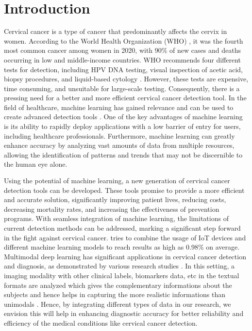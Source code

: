\documentclass[12pt]{report}
\begin{document}
\section{Introduction}
\label{sec:intro}
Cervical cancer is a type of cancer that predominantly affects the cervix in women. According to the World Health Organization (WHO) \cite{WHO}, it was the fourth most common cancer among women in 2020, with 90\% of new cases and deaths occurring in low and middle-income countries. WHO recommends four different tests for detection, including HPV DNA testing, visual inspection of acetic acid, biopsy procedures, and liquid-based cytology \cite{XGBoost}. However, these tests are expensive, time consuming, and unsuitable for large-scale testing. Consequently, there is a pressing need for a better and more efficient cervical cancer detection tool\cite{win2020computer}. In the field of healthcare, machine learning has gained relevance and can be used to create advanced detection tools \cite{HealthCareML}. One of the key advantages of machine learning is its ability to rapidly deploy applications with a low barrier of entry for users, including healthcare professionals\cite{lee2021application}. Furthermore, machine learning can greatly enhance accuracy by analyzing vast amounts of data from multiple resources\cite{gorriz2020artificial}, allowing the identification of patterns and trends that may not be discernible to the human eye alone.

Using the potential of machine learning, a new generation of cervical cancer detection tools can be developed\cite{katki2009risk}. These tools promise to provide a more efficient and accurate solution, significantly improving patient lives, reducing costs, decreasing mortality rates, and increasing the effectiveness of prevention programs. With seamless integration of machine learning, the limitations of current detection methods can be addressed, marking a significant step forward in the fight against cervical cancer.\cite{IoT} tries to combine the usage of IoT devices and different machine learning models to reach results as high as 0.98\% on average. \\
\indent Multimodal deep learning has significant applications in cervical cancer detection and diagnosis, as demonstrated by various research studies \cite{ming2022deep,xu2016multimodal}. In this setting, a imaging modality with other clinical labels, biomarkers data, etc in the textual formats are analyzed which gives the complementary informations about the subjects and hence helps in capturing the more realistic informations than unimodals \cite{ngiam2011multimodal,upadhya2024improving}. Hence, by integrating different types of data in our research, we envision this will help in enhancing diagnostic accuracy for better reliability and efficiency of the medical conditions like cervical cancer detection.
\end{document}
